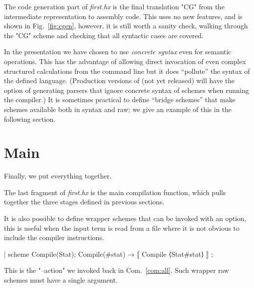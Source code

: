 \documentclass[11pt]{article} %
\begin{document}
\begin{example}\label{ex:cgen}
  The code generation part of \emph{first.hx} is the final translation "CG" from the intermediate
  representation to assembly code. This uses no new features, and is shown in Fig.~\ref{fig:cgen},
  however, it is still worth a sanity check, walking through the "CG" scheme and checking that all
  syntactic cases are covered.
\end{example}

\begin{remark}
  In the presentation we have chosen to use \emph{concrete syntax} even for semantic
  operations. This has the advantage of allowing direct invocation of even complex structured
  calculations from the command line but it does ``pollute'' the syntax of the defined language.
  (Production versions of \HAX (not yet released) will have the option of generating parsers that
  ignore concrete syntax of schemes when running the compiler.) It is sometimes practical to define
  ``bridge schemes'' that make schemes available both in syntax and raw; we give an example of this
  in the following section.
\end{remark}


\section{Main}
\label{sec:main}

Finally, we put everything together.

\begin{example}
  The last fragment of \emph{first.hx} is the main compilation function, which pulls together the
  three stages defined in previous sections.
  It is also possible to define wrapper schemes that can be invoked with an option, this is useful
  when the input term is read from a file where it is not obvious to include the compiler
  instructions.
\begin{code}[xleftmargin=1.66em,numbers=left,firstnumber=last]
| scheme Compile(Stat);
Compile(#stat) → ⟦ Compile ⟨Stat#stat⟩ ⟧ ;
\end{code}
  This is the "--action" we invoked back in Com.~\ref{com:all}.  Such wrapper raw schemes must have
  a single argument.
\end{example}
\end{document}
